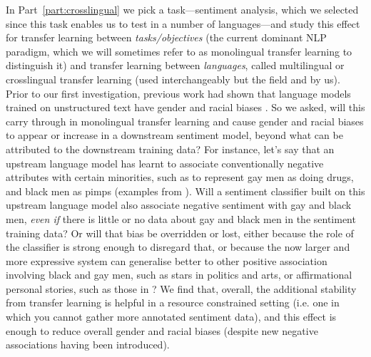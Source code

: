 In Part~\ref{part:crosslingual} we pick a task---sentiment analysis, which we selected since this task enables us to test in a number of languages---and study this effect for transfer learning between \textit{tasks/objectives} (the current dominant NLP paradigm, which we will sometimes refer to as monolingual transfer learning to distinguish it) and transfer learning between \textit{languages}, called multilingual or crosslingual transfer learning (used interchangeably but the field and by us). Prior to our first investigation, previous work had shown that language models trained on unstructured text have gender and racial biases \citep{bolukbasi, Caliskan2017SemanticsDA, zhao-etal-2019-gender, zhao-etal-2020-gender, sheng-etal-2019-woman}. So we asked, will this carry through in monolingual transfer learning and cause gender and racial biases to appear or increase in a downstream sentiment model, beyond what can be attributed to the downstream training data? For instance, let's say that an upstream language model has learnt to associate conventionally negative attributes with certain minorities, such as to represent gay men as doing drugs, and black men as pimps (examples from \citet{sheng-etal-2019-woman}). Will a sentiment classifier built on this upstream language model also associate negative sentiment with gay and black men, \textit{even if} there is little or no data about gay and black men in the sentiment training data? 
Or will that bias be overridden or lost, either because the role of the classifier is strong enough to disregard that, or because the now larger and more expressive system can generalise better to other positive association involving black and gay men, such as stars in politics and arts, or affirmational personal stories, such as those in \cite{Dixon2018MeasuringAM}? We find that, overall, the additional stability from transfer learning is helpful in a resource constrained setting (i.e. one in which you cannot gather more annotated sentiment data), and this effect is enough to reduce overall gender and racial biases (despite new negative associations having been introduced).

